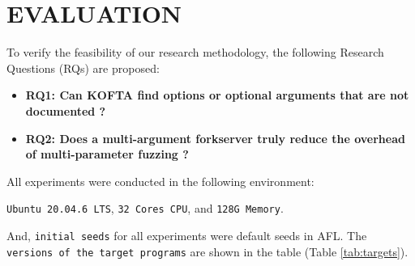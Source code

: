 \section{EVALUATION}
\label{ch:evaluation}

\noindent To verify the feasibility of our research methodology, the following Research Questions (RQs) are proposed:

\begin{itemize}
    \item \textbf{RQ1: Can KOFTA find options or optional arguments that are not documented ?} %
    \item \textbf{RQ2: Does a multi-argument forkserver truly reduce the overhead of multi-parameter fuzzing ?} %

\end{itemize}

All experiments were conducted in the following environment:
\iffalse
\begin{itemize}
    \item Ubuntu 20.04.6 LTS
    \item 32 Cores CPU
    \item 128G Memory
\end{itemize}
\else
\texttt{Ubuntu 20.04.6 LTS}, \texttt{32 Cores CPU}, and \texttt{128G Memory}.
\fi
And, \texttt{initial seeds} for all experiments were default seeds in AFL. The \texttt{versions of the target programs} are shown in the table (Table \ref{tab:targets}).

